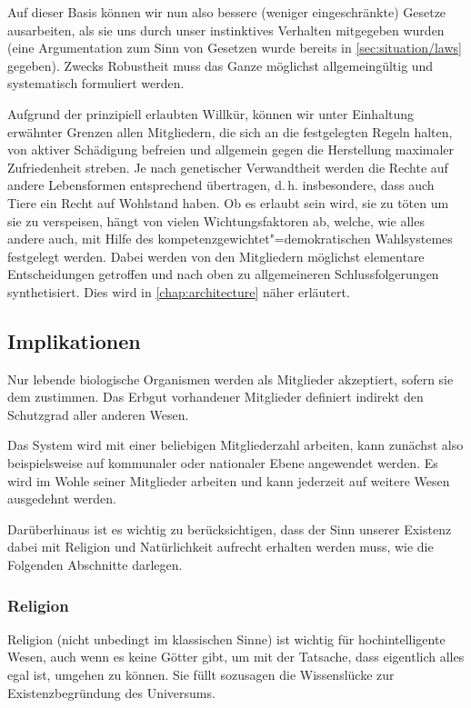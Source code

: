Auf dieser Basis können wir nun also bessere (weniger eingeschränkte) Gesetze ausarbeiten, als sie uns durch unser instinktives Verhalten mitgegeben wurden (eine Argumentation zum Sinn von Gesetzen wurde bereits in \vref{sec:situation/laws} gegeben). Zwecks Robustheit muss das Ganze möglichst allgemeingültig und systematisch formuliert werden.

Aufgrund der prinzipiell erlaubten Willkür, können wir unter Einhaltung erwähnter Grenzen allen Mitgliedern, die sich an die festgelegten Regeln halten, von aktiver Schädigung befreien und allgemein gegen die Herstellung maximaler Zufriedenheit streben. Je nach genetischer Verwandtheit werden die Rechte auf andere Lebensformen entsprechend übertragen, d.\,h. insbesondere, dass auch Tiere ein Recht auf Wohlstand haben. Ob es erlaubt sein wird, sie zu töten um sie zu verspeisen, hängt von vielen Wichtungsfaktoren ab, welche, wie alles andere auch, mit Hilfe des kompetenzgewichtet"=demokratischen Wahlsystemes festgelegt werden. Dabei werden von den Mitgliedern möglichst elementare Entscheidungen getroffen und nach oben zu allgemeineren Schlussfolgerungen synthetisiert. Dies wird in \vref{chap:architecture} näher erläutert.

\subsection{Implikationen}\label{sec:basis/implications}

Nur lebende biologische Organismen werden als Mitglieder akzeptiert, sofern sie dem zustimmen. Das Erbgut vorhandener Mitglieder definiert indirekt den Schutzgrad aller anderen Wesen.

Das System wird mit einer beliebigen Mitgliederzahl arbeiten, kann zunächst also beispielsweise auf kommunaler oder nationaler Ebene angewendet werden. Es wird im Wohle seiner Mitglieder arbeiten und kann jederzeit auf weitere Wesen ausgedehnt werden.

Darüberhinaus ist es wichtig zu berücksichtigen, dass der Sinn unserer Existenz dabei mit Religion und Natürlichkeit aufrecht erhalten werden muss, wie die Folgenden Abschnitte darlegen.

\subsubsection{Religion}

Religion (nicht unbedingt im klassischen Sinne) ist wichtig für hochintelligente Wesen, auch wenn es keine Götter gibt, um mit der Tatsache, dass eigentlich alles egal ist, umgehen zu können. Sie füllt sozusagen die Wissenslücke zur Existenzbegründung des Universums.

